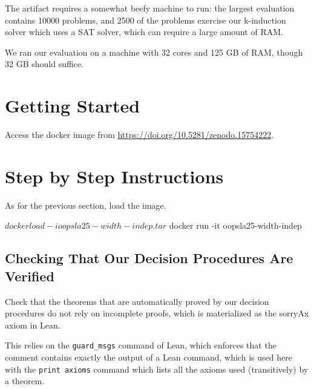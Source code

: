 \documentclass[acmlarge, nonacm]{acmart}
\begin{document}
The artifact requires a somewhat beefy machine to run: the largest evaluation
contains 10000 problems, and 2500 of the problems exercise our k-induction
solver which uses a SAT solver, which can require a large amount of RAM.

We ran our evaluation on a machine with 32 cores and 125 GB of RAM, though 32 GB
should suffice.

\section{Getting Started}

Access the docker image from \url{https://doi.org/10.5281/zenodo.15754222}.



\section{Step by Step Instructions}

As for the previous section, load the image.

\begin{script}
$ docker load -i oopsla25-width-indep.tar
$ docker run -it oopsla25-width-indep
\end{script}

\subsection{Checking That Our Decision Procedures Are Verified}

Check that the theorems that are automatically proved by our decision
procedures do not rely on incomplete proofs, which is materialized as the
sorryAx axiom in Lean.

This relies on the \texttt{guard\_msgs} command of Lean, which enforces that the
comment contains exactly the output of a Lean command, which is used here with
the \texttt{print axioms} command which lists all the axioms used (transitively)
by a theorem.
\end{document}
